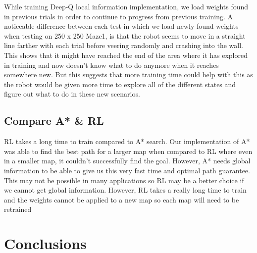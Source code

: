 \documentclass[11pt]{article}
\begin{document}
    While training Deep-Q local information implementation, we load weights found in previous trials in order to continue to progress from previous training. A noticeable difference between each test in which we load newly found weights when testing on 250 x 250 Maze1, is that the robot seems to move in a straight line farther with each trial before veering randomly and crashing into the wall. This shows that it might have reached the end of the area where it has explored in training and now doesn’t know what to do anymore when it reaches somewhere new. But this suggests that more training time could help with this as the robot would be given more time to explore all of the different states and figure out what to do in these new scenarios. 

    \subsection{Compare A* \& RL}
    RL takes a long time to train compared to A* search. Our implementation of A* was able to find the best path for a larger map when compared to RL where even in a smaller map, it couldn’t successfully find the goal. However, A* needs global information to be able to give us this very fast time and optimal path guarantee. This may not be possible in many applications so RL may be a better choice if we cannot get global information. However, RL takes a really long time to train and the weights cannot be applied to a new map so each map will need to be retrained 


\section{Conclusions}

\end{document}
